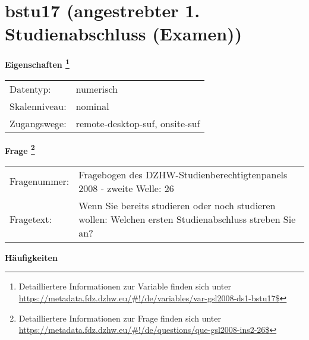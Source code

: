 
    \setcounter{footnote}{0}

    \vspace*{-1.8cm}
	\section{bstu17 (angestrebter 1. Studienabschluss (Examen))}
	\label{section:bstu17}



    \vspace*{0.5cm}
    \noindent\textbf{Eigenschaften
	\footnote{Detailliertere Informationen zur Variable finden sich unter
		\url{https://metadata.fdz.dzhw.eu/\#!/de/variables/var-gsl2008-ds1-bstu17$}}}\\
	\begin{tabularx}{\hsize}{@{}lX}
	Datentyp: & numerisch \\
	Skalenniveau: & nominal \\
	Zugangswege: &
	  remote-desktop-suf, 
	  onsite-suf
 \\
    \end{tabularx}



				\vspace*{0.5cm}
                \noindent\textbf{Frage
	                \footnote{Detailliertere Informationen zur Frage finden sich unter
		              \url{https://metadata.fdz.dzhw.eu/\#!/de/questions/que-gsl2008-ins2-26$}}}\\
				\begin{tabularx}{\hsize}{@{}lX}
					Fragenummer: &
					  Fragebogen des DZHW-Studienberechtigtenpanels 2008 - zweite Welle:
					  26
 \\
					Fragetext: & Wenn Sie bereits studieren oder noch studieren wollen: Welchen ersten Studienabschluss streben Sie an? \\
				\end{tabularx}





        		\vspace*{0.5cm}
                \noindent\textbf{Häufigkeiten}

